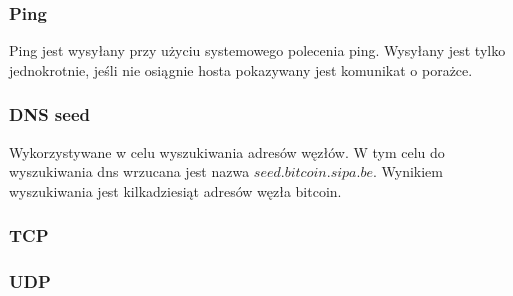 \subsubsection{Ping}
Ping jest wysyłany przy użyciu systemowego polecenia ping. Wysyłany jest tylko jednokrotnie, jeśli nie osiągnie hosta pokazywany jest komunikat o porażce.
\subsubsection{DNS seed}
Wykorzystywane w celu wyszukiwania adresów węzłów. W tym celu do wyszukiwania dns wrzucana jest nazwa $seed.bitcoin.sipa.be$. Wynikiem wyszukiwania jest kilkadziesiąt adresów węzła bitcoin.

\subsubsection{TCP}
\subsubsection{UDP}

